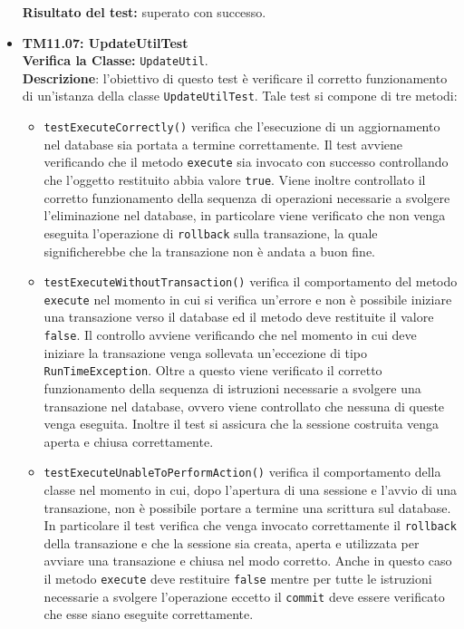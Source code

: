\begin{itemize}
\begin{itemize}
\end{itemize}
\textbf{Risultato del test:} superato con successo.


\item \textbf{TM11.07: UpdateUtilTest}\\
\textbf{Verifica la Classe:} \texttt{UpdateUtil}.\\
\textbf{Descrizione}: l'obiettivo di questo test è verificare il corretto funzionamento di un'istanza della classe \texttt{UpdateUtilTest}.
Tale test si compone di tre metodi:
\begin{itemize}
\item \texttt{testExecuteCorrectly()} verifica che l'esecuzione di un aggiornamento nel database sia portata a termine correttamente. Il test avviene verificando che il metodo \texttt{execute} sia invocato con successo controllando che l'oggetto restituito abbia valore \texttt{true}. Viene inoltre controllato il corretto funzionamento della sequenza di operazioni necessarie a svolgere l'eliminazione nel database, in particolare viene verificato che non venga eseguita l'operazione di \texttt{rollback} sulla transazione, la quale significherebbe che la transazione non è andata a buon fine.

\item \texttt{testExecuteWithoutTransaction()}  verifica il comportamento del metodo \\ \texttt{execute} nel momento in cui si verifica un'errore e non è possibile iniziare una transazione verso il database ed il metodo deve restituite il valore \texttt{false}. Il controllo avviene verificando che nel momento in cui deve iniziare la transazione venga sollevata un'eccezione di tipo \texttt{RunTimeException}. Oltre a questo viene verificato il corretto funzionamento della sequenza di istruzioni necessarie a svolgere una transazione nel database, ovvero viene controllato che nessuna di queste venga eseguita. Inoltre il test si assicura che la sessione costruita venga aperta e chiusa correttamente.

\item \texttt{testExecuteUnableToPerformAction()} verifica il comportamento della classe nel momento in cui, dopo l'apertura di una sessione e l'avvio di una transazione, non è possibile portare a termine una scrittura sul database. In particolare il test verifica che venga invocato correttamente il \texttt{rollback} della transazione e che la sessione sia creata, aperta e utilizzata per avviare una transazione e chiusa nel modo corretto. Anche in questo caso il metodo \texttt{execute} deve restituire \texttt{false} mentre per tutte le istruzioni necessarie a svolgere l'operazione eccetto il \texttt{commit} deve essere verificato che esse siano eseguite correttamente.


\end{itemize}
\end{itemize}
